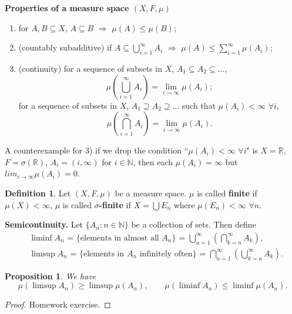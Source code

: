 \documentclass{article}
\newtheorem{proposition}[theorem]{Proposition}
\theoremstyle{definition}
\newtheorem{definition}[theorem]{Definition}
\begin{document}
\vspace{3mm}

{\bf Properties of a measure space $(X, F, \mu)$}

\begin{enumerate}
    \item for $A, B \subseteq X$, $A \subseteq B$ $\Longrightarrow$ $\mu(A) \leq \mu(B)$;
    \item (countably subadditive) if $A \subseteq \bigcup_{i=1}^\infty A_i$ $\Longrightarrow$ $\mu(A) \leq \sum_{i=1}^\infty \mu(A_i)$;
    \item (continuity) for a sequence of subsets in $X$, $A_1 \subseteq A_2 \subseteq ...$, 
    $$\mu(\bigcup_{i=1}^\infty A_i) = \lim_{i \rightarrow \infty} \mu(A_i);$$
    for a sequence of subsets in $X$, $A_1 \supseteq A_2 \supseteq ...$ such that $\mu(A_i) < \infty$ $\forall i$, 
    $$\mu(\bigcap_{i=1}^\infty A_i) = \lim_{i \rightarrow \infty} \mu(A_i).$$
\end{enumerate}

\vspace{3mm}

A counterexample for 3) if we drop the condition ``$\mu(A_i)< \infty$ $\forall i$" is $X = \mathbb{R}$, $F = \sigma(\mathbb{R})$, $A_i = (i, \infty)$ for $i \in \mathbb{N}$, then each $\mu(A_i) = \infty$ but $lim_{i \rightarrow \infty} \mu(A_i) = 0$.

\begin{definition}
Let $(X,F,\mu)$ be a measure space. $\mu$ is called {\bf finite} if $\mu(X) < \infty$, $\mu$ is called \textbf{$\sigma$-finite} if $X = \bigcup E_n$ where $\mu(E_n) < \infty$ $\forall n$.
\end{definition}

\vspace{3mm}

\noindent 
{\bf Semicontinuity.} Let $\{A_n: n \in \mathbb{N}\}$ be a collection of sets. Then define
\begin{align*}
	&
	\text{$\liminf A_n$ = $\{$elements in almost all $A_n \}$ = $\bigcup_{n=1}^\infty(\bigcap_{k=n}^\infty A_k)$},
	\\&
	\text{$\limsup A_n$ = $\{$elements in $A_n$ infinitely often$\}$ = $\bigcap_{n=1}^\infty(\bigcup_{k=n}^\infty A_k)$}.
\end{align*}

\begin{proposition} We have
	\begin{equation*}
		\mu(\limsup A_n) \geq \limsup \mu(A_n),\qquad 
		\mu(\liminf A_n) \le \liminf \mu(A_n).
	\end{equation*}
\end{proposition}
\begin{proof}
	Homework exercise.
\end{proof}
\end{document}
